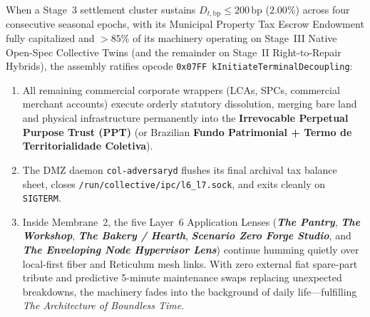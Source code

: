 When a Stage~3 settlement cluster sustains $D_{t,\mathrm{bp}} \le 200\,\mathrm{bp}$ ($2.00\%$) across four consecutive seasonal epochs, with its Municipal Property Tax Escrow Endowment fully capitalized and $>85\%$ of its machinery operating on Stage~III Native Open-Spec Collective Twins (and the remainder on Stage~II Right-to-Repair Hybrids), the assembly ratifies opcode \texttt{0x07FF kInitiateTerminalDecoupling}:
\begin{enumerate}
    \item All remaining commercial corporate wrappers (LCAs, SPCs, commercial merchant accounts) execute orderly statutory dissolution, merging bare land and physical infrastructure permanently into the \textbf{Irrevocable Perpetual Purpose Trust (PPT)} (or Brazilian \textbf{Fundo Patrimonial + Termo de Territorialidade Coletiva}).
    \item The DMZ daemon \texttt{col-adversaryd} flushes its final archival tax balance sheet, closes \texttt{/run/collective/ipc/l6\_l7.sock}, and exits cleanly on \texttt{SIGTERM}.
    \item Inside Membrane~2, the five Layer~6 Application Lenses (\textbf{\textit{The Pantry}}, \textbf{\textit{The Workshop}}, \textbf{\textit{The Bakery / Hearth}}, \textbf{\textit{Scenario Zero Forge Studio}}, and \textbf{\textit{The Enveloping Node Hypervisor Lens}}) continue humming quietly over local-first fiber and Reticulum mesh links. With zero external fiat spare-part tribute and predictive 5-minute maintenance swaps replacing unexpected breakdowns, the machinery fades into the background of daily life---fulfilling \textit{The Architecture of Boundless Time}.
\end{enumerate}
